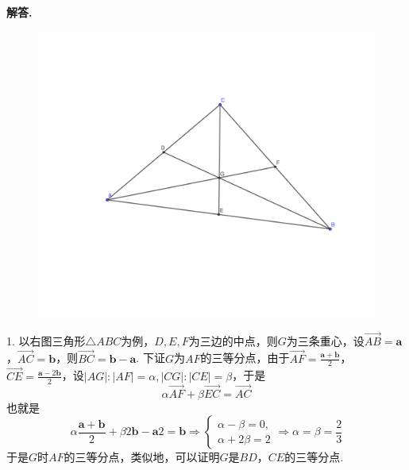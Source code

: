 \documentclass[12pt, a4paper, oneside]{ctexart}
\newenvironment{solution}[1][]{\par\noindent\textbf{#1解答. }}{\smallskip\par}  %
\def\bd{\boldsymbol}        %
\begin{document}
\begin{solution}\vspace{-0.5cm}\\
\begin{figure} %
    \vspace{-1cm}
    \includegraphics[scale=0.33]{微分几何第一次作业.pdf} %
\end{figure}
1. 以右图三角形$\triangle ABC$为例，$D,E,F$为三边的中点，则$G$为三条重心，设$\overrightarrow{AB} = \bd{a}$，$\overrightarrow{AC} = \bd{b}$，则$\overrightarrow{BC} = \bd{b}-\bd{a}$. 
下证$G$为$AF$的三等分点，由于$\overrightarrow{AF} = \frac{\bd{a}+\bd{b}}{2}$，$\overrightarrow{CE} = \frac{\bd{a}-2\bd{b}}{2}$，设$|AG|:|AF| = \alpha, |CG|:|CE| = \beta$，于是
\begin{equation*}
    \alpha \overrightarrow{AF} + \beta\overrightarrow{EC} = \overrightarrow{AC}
\end{equation*}
也就是
\begin{equation*}
    \alpha\frac{\bd{a}+\bd{b}}{2}+\beta{2\bd{b}-\bd{a}}{2} = \bd{b}\Rightarrow \begin{cases}
        \alpha-\beta = 0,\\
        \alpha+2\beta = 2
    \end{cases}\Rightarrow \alpha = \beta = \frac{2}{3}
\end{equation*}
于是$G$时$AF$的三等分点，类似地，可以证明$G$是$BD$，$CE$的三等分点.


\end{solution}
\end{document}

